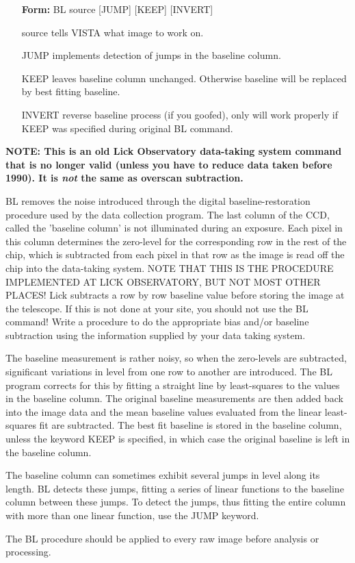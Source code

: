 \begin{itemize}
  \item[\textbf{Form: }BL source {[JUMP]} {[KEEP]} {[INVERT]}\hfill]{}
  \item[source]{tells VISTA what image to work on.}
  \item[JUMP]{implements detection of jumps in the baseline column.}
  \item[KEEP]{leaves baseline column unchanged. Otherwise
       baseline will be replaced by best fitting baseline.}
  \item[INVERT]{reverse baseline process (if you goofed), only
                will work properly if KEEP was specified during
                original BL command.}
\end{itemize}

{\bf NOTE: This is an old Lick Observatory data-taking system command
that is no longer valid (unless you have to reduce data taken before
1990).  It is {\it not} the same as overscan subtraction.}

BL removes the noise introduced through the digital baseline-restoration
procedure used by the data collection program.  The last column of the CCD,
called the 'baseline column' is not illuminated during an exposure.  Each
pixel in this column determines the zero-level for the corresponding row in
the rest of the chip, which is subtracted from each pixel in that row as
the image is read off the chip into the data-taking system.  NOTE THAT THIS
IS THE PROCEDURE IMPLEMENTED AT LICK OBSERVATORY, BUT NOT MOST OTHER
PLACES!  Lick subtracts a row by row baseline value before storing the
image at the telescope. If this is not done at your site, you should not
use the BL command!  Write a procedure to do the appropriate bias and/or
baseline subtraction using the information supplied by your data taking
system.

The baseline measurement is rather noisy, so when the zero-levels are
subtracted, significant variations in level from one row to another are
introduced.  The BL program corrects for this by fitting a straight line by
least-squares to the values in the baseline column. The original baseline
measurements are then added back into the image data and the mean baseline
values evaluated from the linear least-squares fit are subtracted.  The
best fit baseline is stored in the baseline column, unless the keyword KEEP
is specified, in which case the original baseline is left in the baseline
column.

The baseline column can sometimes exhibit several jumps in level along its
length.  BL detects these jumps, fitting a series of linear functions to
the baseline column between these jumps.  To detect the jumps, thus fitting
the entire column with more than one linear function, use the JUMP keyword.

The BL procedure should be applied to every raw image before analysis or
processing.

